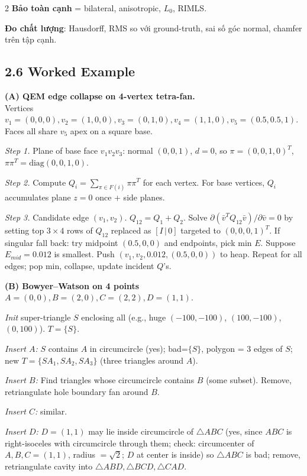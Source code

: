 \begin{paracol}{2}
\textbf{Bảo toàn cạnh} = bilateral, anisotropic, $L_0$, RIMLS.

\textbf{Đo chất lượng}: Hausdorff, RMS so với ground-truth, sai số góc normal, chamfer trên tập cạnh.

\switchcolumn*

\subsection*{2.6 Worked Example}

\textbf{(A) QEM edge collapse on 4-vertex tetra-fan.}\\
Vertices $v_1=(0,0,0), v_2=(1,0,0), v_3=(0,1,0), v_4=(1,1,0), v_5=(0.5,0.5,1)$. Faces all share $v_5$ apex on a square base.

\emph{Step 1.} Plane of base face $v_1v_2v_3$: normal $(0,0,1)$, $d=0$, so $\pi=(0,0,1,0)^T$, $\pi\pi^T=\mathrm{diag}(0,0,1,0)$.

\emph{Step 2.} Compute $Q_i=\sum_{\pi\in F(i)}\pi\pi^T$ for each vertex. For base vertices, $Q_i$ accumulates plane $z=0$ once + side planes.

\emph{Step 3.} Candidate edge $(v_1,v_2)$. $Q_{12}=Q_1+Q_2$. Solve $\partial(\bar v^TQ_{12}\bar v)/\partial\bar v=0$ by setting top $3\times4$ rows of $Q_{12}$ replaced as $[I\,|\,0]$ targeted to $(0,0,0,1)^T$. If singular fall back: try midpoint $(0.5,0,0)$ and endpoints, pick min $E$. Suppose $E_{mid}=0.012$ is smallest. Push $(v_1,v_2,0.012,(0.5,0,0))$ to heap. Repeat for all edges; pop min, collapse, update incident $Q$'s.

\textbf{(B) Bowyer–Watson on 4 points} $A=(0,0),B=(2,0),C=(2,2),D=(1,1)$.

\emph{Init} super-triangle $S$ enclosing all (e.g., huge $(-100,-100)$, $(100,-100)$, $(0,100)$). $T=\{S\}$.

\emph{Insert $A$:} $S$ contains $A$ in circumcircle (yes); bad=$\{S\}$, polygon = 3 edges of $S$; new $T = \{SA_1,SA_2,SA_3\}$ (three triangles around $A$).

\emph{Insert $B$:} Find triangles whose circumcircle contains $B$ (some subset). Remove, retriangulate hole boundary fan around $B$.

\emph{Insert $C$:} similar.

\emph{Insert $D$:} $D=(1,1)$ may lie inside circumcircle of $\triangle ABC$ (yes, since $ABC$ is right-isoceles with circumcircle through them; check: circumcenter of $A,B,C=(1,1)$, radius $=\sqrt 2$; $D$ at center is inside) so $\triangle ABC$ is bad; remove, retriangulate cavity into $\triangle ABD,\triangle BCD,\triangle CAD$.


\end{paracol}
